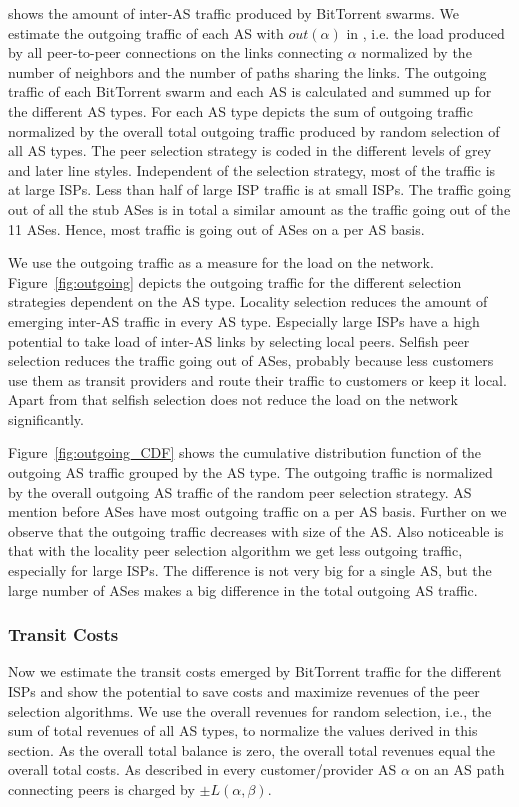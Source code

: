  shows the amount of inter-AS traffic produced by BitTorrent swarms. We estimate the outgoing traffic of each AS with $out(\alpha)$ in , i.e. the load produced by all peer-to-peer connections on the links connecting $\alpha$ normalized by the number of neighbors and the number of paths sharing the links. The outgoing traffic of each BitTorrent swarm and each AS is calculated and summed up for the different AS types. For each AS type  depicts the sum of outgoing traffic normalized by the overall total outgoing traffic produced by random selection of all AS types. The peer selection strategy is coded in the different levels of grey and later line styles. Independent of the selection strategy, most of the traffic is at large ISPs. Less than half of large ISP traffic is at small ISPs. The traffic going out of all the stub ASes is in total a similar amount as the traffic going out of the 11 \tier ASes. Hence, most traffic is going out of \tier ASes on a per AS basis.

We use the outgoing traffic as a measure for the load on the network.
Figure~\ref{fig:outgoing} depicts the outgoing traffic for the different selection strategies dependent on the AS type. Locality selection reduces the amount of emerging inter-AS traffic in every AS type. Especially large ISPs have a high potential to take load of inter-AS links by selecting local peers. Selfish peer selection reduces the traffic going out of \tier ASes, probably because less customers use them as transit providers and route their traffic to customers or keep it local. Apart from that selfish selection does not reduce the load on the network significantly.

Figure~\ref{fig:outgoing_CDF} shows the cumulative distribution function of the outgoing AS traffic grouped by the AS type. The outgoing traffic is normalized by the overall outgoing AS traffic of the random peer selection strategy. AS mention before \tier ASes have most outgoing traffic on a per AS basis. Further on we observe that the outgoing traffic decreases with size of the AS. Also noticeable is that with the locality peer selection algorithm we get less outgoing traffic, especially for large ISPs. The difference is not very big for a single AS, but the large number of ASes makes a big difference in the total outgoing AS traffic.

\subsubsection{Transit Costs}
Now we estimate the transit costs emerged by BitTorrent traffic for the different ISPs and show the potential to save costs and maximize revenues of the peer selection algorithms. We use the overall revenues for random selection, i.e., the sum of total revenues of all AS types, to normalize the values derived in this section. As the overall total balance is zero, the overall total revenues equal the overall total costs.
As described in  every customer/provider AS $\alpha$ on an AS path connecting peers is charged by $\pm L(\alpha,\beta)$.

